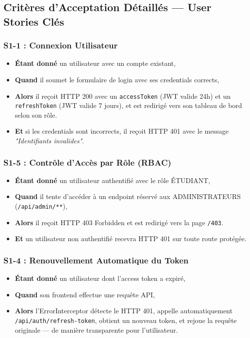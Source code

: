 \documentclass[12pt,a4paper]{report}
\begin{document}
\subsection{Critères d'Acceptation Détaillés — User Stories Clés}

\subsubsection{S1-1 : Connexion Utilisateur}
\begin{itemize}[itemsep=0.2em]
    \item \textbf{Étant donné} un utilisateur avec un compte existant,
    \item \textbf{Quand} il soumet le formulaire de login avec ses credentials corrects,
    \item \textbf{Alors} il reçoit HTTP 200 avec un \texttt{accessToken} (JWT valide 24h) et un \texttt{refreshToken} (JWT valide 7 jours), et est redirigé vers son tableau de bord selon son rôle.
    \item \textbf{Et} si les credentials sont incorrects, il reçoit HTTP 401 avec le message \textit{"Identifiants invalides"}.
\end{itemize}

\subsubsection{S1-5 : Contrôle d'Accès par Rôle (RBAC)}
\begin{itemize}[itemsep=0.2em]
    \item \textbf{Étant donné} un utilisateur authentifié avec le rôle ÉTUDIANT,
    \item \textbf{Quand} il tente d'accéder à un endpoint réservé aux ADMINISTRATEURS (\texttt{/api/admin/**}),
    \item \textbf{Alors} il reçoit HTTP 403 Forbidden et est redirigé vers la page \texttt{/403}.
    \item \textbf{Et} un utilisateur non authentifié recevra HTTP 401 sur toute route protégée.
\end{itemize}

\subsubsection{S1-4 : Renouvellement Automatique du Token}
\begin{itemize}[itemsep=0.2em]
    \item \textbf{Étant donné} un utilisateur dont l'access token a expiré,
    \item \textbf{Quand} son frontend effectue une requête API,
    \item \textbf{Alors} l'ErrorInterceptor détecte le HTTP 401, appelle automatiquement \texttt{/api/auth/refresh-token}, obtient un nouveau token, et rejoue la requête originale — de manière transparente pour l'utilisateur.
\end{itemize}
\end{document}
